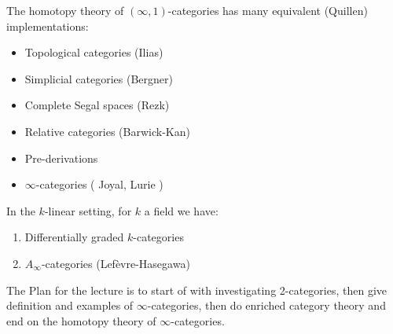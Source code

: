 \begin{Warning}
    The homotopy theory of $ ( \infty ,1 ) $-categories has many equivalent (Quillen) implementations:
    \begin{itemize}
        \item 
        Topological categories (Ilias)

        \item 
        Simplicial categories (Bergner)

        \item 
        Complete Segal spaces (Rezk)

        \item 
        Relative categories (Barwick-Kan)

        \item 
        Pre-derivations

        \item 
        $\infty$-categories ( Joyal, Lurie )
    \end{itemize}

    In the $k$-linear setting, for $k$ a field we have:

    \begin{enumerate}[resume]
        \item 
        Differentially graded $k$-categories

        \item 
        $A_\infty$-categories (Lefèvre-Hasegawa)
    \end{enumerate}
    
\end{Warning}

The Plan for the lecture is to start of with investigating 2-categories, then give definition and examples of $ \infty $-categories, then do enriched category theory and end on the homotopy theory of $\infty$-categories.
